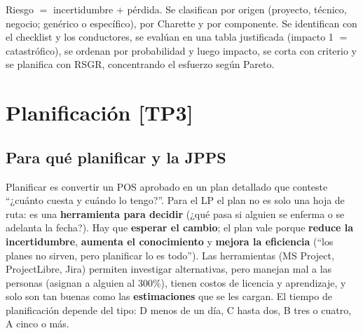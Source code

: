 \documentclass[11pt,a4paper]{article}
\begin{document}
\begin{enresumen}
Riesgo $=$ incertidumbre $+$ pérdida. Se clasifican por origen (proyecto, técnico, negocio; genérico o
específico), por Charette y por componente. Se identifican con el checklist y los conductores, se evalúan en
una tabla justificada (impacto 1 $=$ catastrófico), se ordenan por probabilidad y luego impacto, se corta con
criterio y se planifica con RSGR, concentrando el esfuerzo según Pareto.
\end{enresumen}

\section[Planificación]{Planificación \hfill {\normalsize [TP3]}}
\subsection{Para qué planificar y la JPPS}
Planificar es convertir un POS aprobado en un plan detallado que conteste ``¿cuánto cuesta y cuándo lo tengo?''.
Para el LP el plan no es solo una hoja de ruta: es una \textbf{herramienta para decidir} (¿qué pasa si alguien
se enferma o se adelanta la fecha?). Hay que \textbf{esperar el cambio}; el plan vale porque \textbf{reduce la
incertidumbre}, \textbf{aumenta el conocimiento} y \textbf{mejora la eficiencia} (``los planes no sirven, pero
planificar lo es todo''). Las herramientas (MS Project, ProjectLibre, Jira) permiten investigar alternativas,
pero manejan mal a las personas (asignan a alguien al 300\%), tienen costos de licencia y aprendizaje, y solo
son tan buenas como las \textbf{estimaciones} que se les cargan. El tiempo de planificación depende del tipo:
D menos de un día, C hasta dos, B tres o cuatro, A cinco o más.
\end{document}
